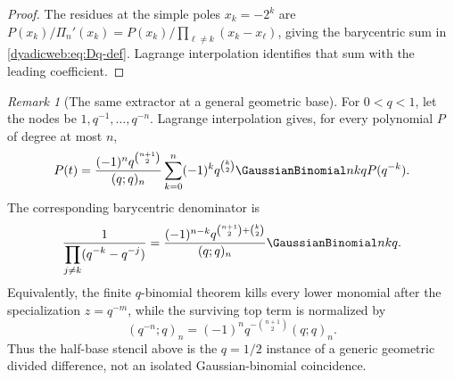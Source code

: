 \documentclass[11pt,oneside]{article}
\theoremstyle{definition}
\theoremstyle{remark}
\newtheorem{remark}[remark]{Remark}
\begin{document}
\begin{proof}
The residues at the simple poles $x_k=-2^k$ are
$P(x_k)/\Pi_n'(x_k)=P(x_k)/\prod_{\ell\ne k}(x_k-x_\ell)$, giving the barycentric sum in
\eqref{dyadicweb:eq:Dq-def}.  Lagrange interpolation identifies that sum with the leading coefficient.
\end{proof}

\begin{remark}[The same extractor at a general geometric base]
For $0<q<1$, let the nodes be $1,q^{-1},\ldots,q^{-n}$.  Lagrange interpolation gives,
for every polynomial $P$ of degree at most $n$,
\begin{equation}
 [t^n]P(t)
 =\frac{(-1)^nq^{\binom{n+1}{2}}}{(q;q)_n}
  \sum_{k=0}^{n}(-1)^kq^{\binom k2}\GaussianBinomial nkq P(q^{-k}).
 \label{dyadicq:eq:q-leading-extractor-general}
\end{equation}
The corresponding barycentric denominator is
\begin{equation}
 \frac1{\displaystyle\prod_{j\ne k}(q^{-k}-q^{-j})}
 =\frac{(-1)^{n-k}q^{\binom{n+1}{2}+\binom k2}}
 {(q;q)_n}\GaussianBinomial nkq.                                   \label{dyadicq:eq:barycentric-denominator}
\end{equation}
Equivalently, the finite $q$-binomial theorem kills every lower monomial after the
specialization $z=q^{-m}$, while the surviving top term is normalized by
\begin{equation}
 (q^{-n};q)_n=(-1)^nq^{-\binom{n+1}{2}}(q;q)_n.           \label{dyadicq:eq:q-survivor}
\end{equation}
Thus the half-base stencil above is the $q=1/2$ instance of a generic geometric divided
difference, not an isolated Gaussian-binomial coincidence.
\end{remark}
\end{document}
